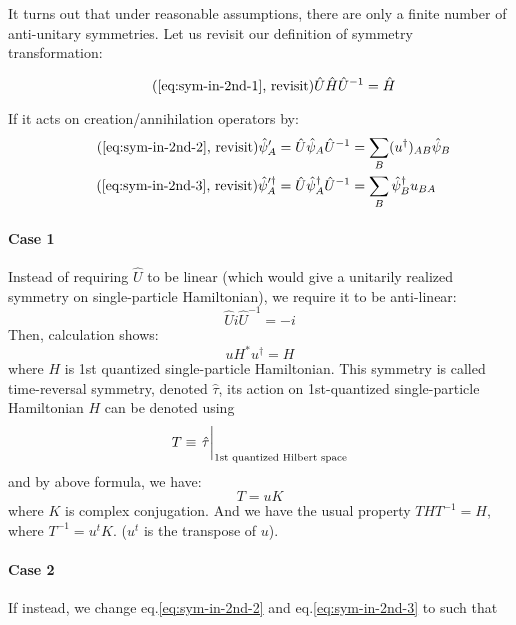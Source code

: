 \documentclass{article}
\begin{document}
It turns out that under reasonable assumptions, there are only a
finite number of anti-unitary symmetries. Let us revisit our
definition of symmetry transformation:

\begin{equation*}
    \tag{\ref{eq:sym-in-2nd-1}, revisit}
    \hat{U}\hat{H}\hat{U}^{-1} = \hat{H}
\end{equation*}

If it acts on creation/annihilation operators by:
\begin{align*}
    \tag{\ref{eq:sym-in-2nd-2}, revisit}
    \hat{\psi}'_A = 
    \hat{U} \hat\psi_A \hat{U}^{-1} &=
    \sum_B (u^\dagger)_{AB} \hat\psi_B \\
    \tag{\ref{eq:sym-in-2nd-3}, revisit}
    \hat\psi'^\dagger_A =
    \hat{U} \hat\psi^\dagger_A \hat{U}^{-1} &= 
    \sum_B  \hat\psi^\dagger_B u_{BA}
\end{align*}

\paragraph{Case 1} Instead of requiring $\hat{U}$ to be linear (which
would give a unitarily realized symmetry on single-particle
Hamiltonian), we require it to be anti-linear:
\begin{equation}
    \hat{U} i \hat{U}^{-1} = -i
\end{equation}
Then, calculation shows:
\begin{equation}
    u H^* u^\dagger = H
\end{equation}
where $H$ is 1st quantized single-particle Hamiltonian. This symmetry
is called time-reversal symmetry, denoted $\hat{\tau}$, its action on
1st-quantized single-particle Hamiltonian $H$ can be denoted using
\begin{equation}
    T \equiv \eval{\hat{\tau}}_{\text{1st quantized Hilbert space}}
\end{equation}
and by above formula, we have:
\begin{equation}
    T = uK
\end{equation}
where $K$ is complex conjugation. And we have the usual property
$THT^{-1}=H$, where $T^{-1}=u^t K$. ($u^t$ is the transpose of $u$).

\paragraph{Case 2} If instead, we change eq.\ref{eq:sym-in-2nd-2} and
eq.\ref{eq:sym-in-2nd-3} to such that
\end{document}
